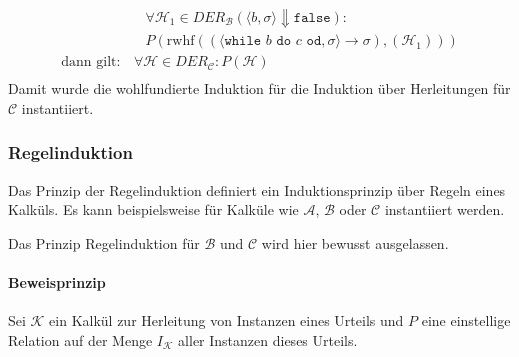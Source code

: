 \begin{align*}
																		                  & \quad \forall \mathcal{H} _ 1 \in \textit{DER} _ \mathcal{B} (\langle b, \sigma \rangle \Downarrow \texttt{false}) : \tag{Kalkülfremde Herleitungen}                                                                                                      \\
																		                  & \quad P(\text{rwhf}((\langle \texttt{while } b \texttt{ do } c \texttt{ od}, \sigma \rangle \rightarrow \sigma), (\mathcal{H} _ 1))) \tag{Konklusion}                                                                                                     \\
																		\text{dann gilt:} & \,\forall \mathcal{H} \in \textit{DER} _ \mathcal{C} : P(\mathcal{H})                                                                                                                                                                                     \\
																	\end{align*}
																	Damit wurde die wohlfundierte Induktion für die Induktion über Herleitungen für $ \mathcal{C} $ instantiiert.

																\subsubsection{Regelinduktion}
																	Das Prinzip der Regelinduktion definiert ein Induktionsprinzip über Regeln eines Kalküls. Es kann beispielsweise für Kalküle wie $ \mathcal{A} $, $ \mathcal{B} $ oder $ \mathcal{C} $ instantiiert werden.

																	Das Prinzip Regelinduktion für $ \mathcal{B} $ und $ \mathcal{C} $ wird hier bewusst ausgelassen.

																	\paragraph{Beweisprinzip}
																		Sei $ \mathcal{K} $ ein Kalkül zur Herleitung von Instanzen eines Urteils und $ P $ eine einstellige Relation auf der Menge $ I _ \mathcal{K} $ aller Instanzen dieses Urteils.


